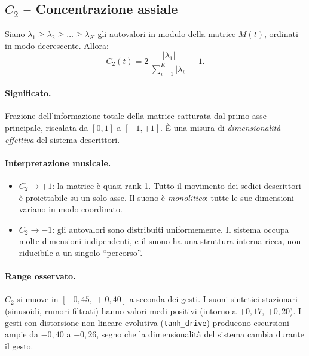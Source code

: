\documentclass[a4paper,11pt]{article}
\begin{document}
\subsection{$C_2$ -- Concentrazione assiale}

\formula
Siano $\lambda_1 \ge \lambda_2 \ge \dots \ge \lambda_K$ gli autovalori
in modulo della matrice $M(t)$, ordinati in modo decrescente. Allora:
\[
C_2(t) = 2\,\frac{\lvert \lambda_1 \rvert}{\sum_{i=1}^{K} \lvert \lambda_i \rvert} - 1.
\]

\paragraph{Significato.}
Frazione dell'informazione totale della matrice catturata dal primo asse
principale, riscalata da $[0, 1]$ a $[-1, +1]$. È una misura di
\emph{dimensionalità effettiva} del sistema descrittori.

\paragraph{Interpretazione musicale.}
\begin{itemize}[nosep]
  \item $C_2 \to +1$: la matrice è quasi rank-1. Tutto il movimento dei
        sedici descrittori è proiettabile su un solo asse. Il suono è
        \emph{monolitico}: tutte le sue dimensioni variano in modo
        coordinato.
  \item $C_2 \to -1$: gli autovalori sono distribuiti uniformemente.
        Il sistema occupa molte dimensioni indipendenti, e il suono ha
        una struttura interna ricca, non riducibile a un singolo
        ``percorso''.
\end{itemize}

\paragraph{Range osservato.}
$C_2$ si muove in $[-0{,}45,\, +0{,}40]$ a seconda dei gesti. I suoni
sintetici stazionari (sinusoidi, rumori filtrati) hanno valori medi
positivi (intorno a $+0{,}17$, ${+0{,}20}$). I gesti con distorsione
non-lineare evolutiva (\texttt{tanh\_drive}) producono escursioni ampie
da $-0{,}40$ a $+0{,}26$, segno che la dimensionalità del sistema cambia
durante il gesto.

\end{document}
